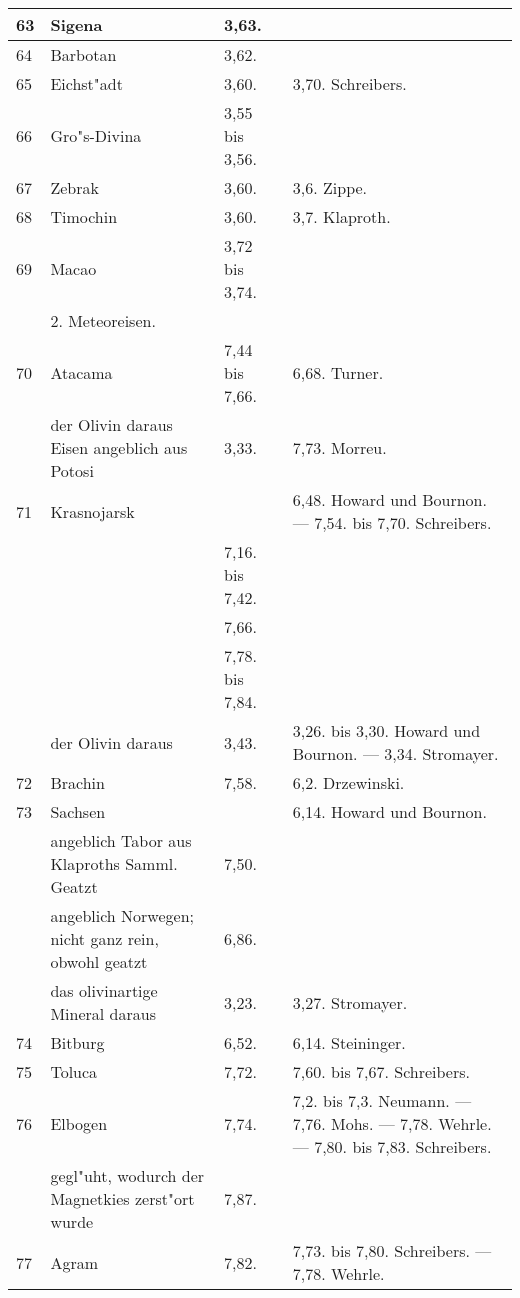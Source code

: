 \documentclass[a4paper, 11pt, oneside, polutonikogreek, german]{article}
\begin{document}
\begin{center}
\begin{longtable}{|p{7mm}|p{32mm}|p{30mm}|p{30mm}|}
        63 & Sigena & 3,63. &   \\ \hline
        64 & Barbotan & 3,62. &   \\ \hline
        65 & Eichst"adt & 3,60. & 3,70. Schreibers. \\ \hline
        66 & Gro"s-Divina & 3,55 bis 3,56. &   \\ \hline
        67 & Zebrak & 3,60. & 3,6. Zippe. \\ \hline
        68 & Timochin & 3,60. & 3,7. Klaproth. \\ \hline
        69 & Macao & 3,72 bis 3,74. &   \\ \hline
          & 2. Meteoreisen. &   &   \\ \hline
        70 & Atacama & 7,44 bis 7,66. & 6,68. Turner. \\ \hline
          & der Olivin daraus Eisen angeblich aus Potosi & 3,33. & 7,73. Morreu. \\ \hline
        71 & Krasnojarsk &   & 6,48. Howard und Bournon. --- 7,54. bis 7,70. Schreibers. \\ \hline
         ~ &   & 7,16. bis 7,42. &   \\ \hline
         ~ &   & 7,66. &   \\ \hline
         ~ &   & 7,78. bis 7,84. &   \\ \hline
        ~ & der Olivin daraus & 3,43. & 3,26. bis 3,30. Howard und Bournon. --- 3,34. Stromayer. \\ \hline
        72 & Brachin & 7,58. & 6,2. Drzewinski. \\ \hline
        73 & Sachsen &   & 6,14. Howard und Bournon. \\ \hline
         ~ & angeblich Tabor aus Klaproths Samml. Geatzt & 7,50. &   \\ \hline
         ~ & angeblich Norwegen; nicht ganz rein, obwohl geatzt & 6,86. &   \\ \hline
        ~  & das olivinartige Mineral daraus & 3,23. & 3,27. Stromayer. \\ \hline
        74 & Bitburg & 6,52. & 6,14. Steininger. \\ \hline
        75 & Toluca & 7,72. & 7,60. bis 7,67. Schreibers. \\ \hline
        76 & Elbogen & 7,74. & 7,2. bis 7,3. Neumann. --- 7,76. Mohs. --- 7,78. Wehrle. --- 7,80. bis 7,83. Schreibers. \\ \hline
         ~ & gegl"uht, wodurch der Magnetkies zerst"ort wurde & 7,87. & ~  \\ \hline
        77 & Agram & 7,82. & 7,73. bis 7,80. Schreibers. --- 7,78. Wehrle. \\ \hline

\end{longtable}
\end{center}
\end{document}
